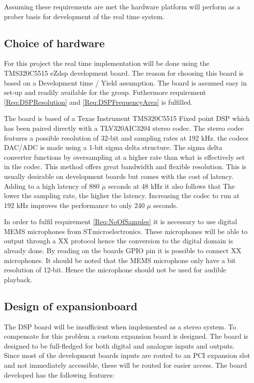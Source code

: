 Assuming these requirements are met the hardware platform will perform as a prober basis for development of the real time system.

\subsection{Choice of hardware}\label{subsec:ChoiceOfHardware}

For this project the real time implementation will be done using the TMS320C5515 eZdsp development board. The reason for choosing this board is based on a Development time / Yield assumption. The board is assumed easy in set-up and readily available for the group. Futhermore requirement \ref{Req:DSPResolution} and \ref{Req:DSPFrequencyArea} is fulfilled.

The board is based of a Texas Instrument TMS320C5515 Fixed point DSP which has been paired directly with a TLV320AIC3204 stereo codec. The stereo codec features a possible resolution of 32-bit and sampling rates at 192 kHz. the codecs DAC/ADC is made using a 1-bit sigma delta structure. The sigma delta converter functions by oversampling at a higher rate than what is effectively set in the codec. This method offers great bandwidth and flexible resolution. This is usually desirable on development boards but comes with the cost of latency. Adding to a high latency of 880 $\mu$ seconds at 48 kHz it also follows that The lower the sampling rate, the higher the latency. Increasing the codec to run at 192 kHz improves the performance to only 240 $\mu$ seconds.

In order to fulfil requirement \ref{Req:NoOfSamples} it is necessary to use digital MEMS microphones from STmicroelectronics. These microphones will be able to output through a XX protocol hence the conversion to the digital domain is already done. By reading on the boards GPIO pin it is possible to connect XX microphones. It should be noted that the MEMS microphone only have a bit resolution of 12-bit. Hence the microphone should not be used for audible playback.





\subsection{Design of expansionboard}\label{subsec:DesignOfExpansion}

The DSP board will be insufficient when implemented as a stereo system. To compensate for this problem a custom expansion board is designed. The board is designed to be full-fledged for both digital and analogue inputs and outputs. Since most of the development boards inputs are routed to an PCI expansion slot and not immediately accessible, these will be routed for easier access. The board developed has the following features:

